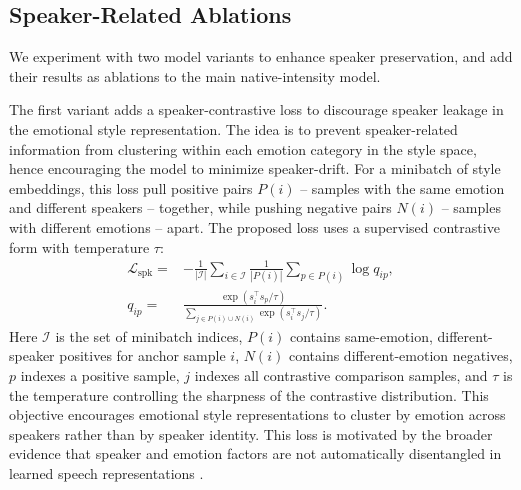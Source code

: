\subsection{Speaker-Related Ablations}
We experiment with two model variants to enhance speaker preservation, and add their results as ablations to the main native-intensity model.

The first variant  adds a speaker-contrastive loss to discourage speaker leakage in the emotional style representation. The idea is to prevent speaker-related information from clustering within each emotion category in the style space, hence encouraging the model to minimize speaker-drift.
For a minibatch of style embeddings, this loss pull positive pairs $ P(i) $ -- samples with the same emotion and different speakers -- together, while pushing negative pairs $ N(i) $ -- samples with different emotions -- apart.
The proposed loss uses a supervised contrastive form with temperature $\tau$:
\begin{align}
\mathcal{L}_{\mathrm{spk}}
=&
-\frac{1}{|\mathcal{I}|}
\sum_{i\in\mathcal{I}}
\frac{1}{|P(i)|}
\sum_{p\in P(i)}
\log q_{ip},
\nonumber\\
q_{ip}
=&
\frac{\exp(s_i^\top s_p/\tau)}
{\sum_{j\in P(i)\cup N(i)}\exp(s_i^\top s_j/\tau)} .
\end{align}
Here $\mathcal{I}$ is the set of minibatch indices, $P(i)$ contains same-emotion, different-speaker positives for anchor sample $i$, $N(i)$ contains different-emotion negatives, $p$ indexes a positive sample, $j$ indexes all contrastive comparison samples, and $\tau$ is the temperature controlling the sharpness of the contrastive distribution.
This objective encourages emotional style representations to cluster by emotion across speakers rather than by speaker identity.
This loss is motivated by the broader evidence that speaker and emotion factors are not automatically disentangled in learned speech representations \cite{qian2019autovc,chou2024diffevc,dutta2024zest,miao2024emotionpreservinganonymization}.

